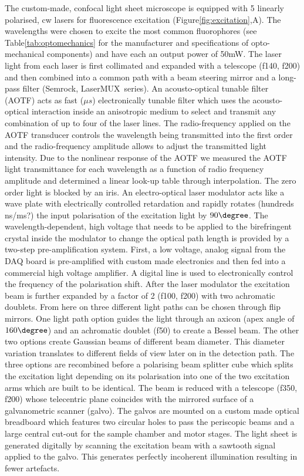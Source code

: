 \documentclass[12pt]{spieman}  %
\begin{document}
The custom-made, confocal light sheet microscope is equipped with 5 linearly polarised, cw lasers for fluorescence excitation (Figure\ref{fig:excitation},A). The wavelengths were chosen to excite the most common fluorophores (see Table\ref{tab:optomechanics} for the manufacturer and specifications of opto-mechanical components) and have each an output power of 50mW. The laser light from each laser is first collimated and expanded with a telescope (f140, f200) and then combined into a common path with a beam steering mirror and a long-pass filter (Semrock, LaserMUX\texttrademark\ series). An acousto-optical tunable filter (AOTF) acts as fast ($\mu s$) electronically tunable filter which uses the acousto-optical interaction inside an anisotropic medium to select and transmit any combination of up to four of the laser lines. The radio-frequency applied on the AOTF transducer controls the wavelength being transmitted into the first order and the radio-frequency amplitude allows to adjust the transmitted light intensity. Due to the nonlinear response of the AOTF we measured the AOTF light transmittance for each wavelength as a function of radio frequency amplitude and determined a linear look-up table through interpolation. The zero order light is blocked by an iris. An electro-optical laser modulator acts like a wave plate with electrically controlled retardation and rapidly rotates (hundreds ns/ms?) the input polarisation of the excitation light by $90\degree$. The wavelength-dependent, high voltage that needs to be applied to the birefringent crystal inside the modulator to change the optical path length is provided by a two-step pre-amplification system. First, a low voltage, analog signal from the DAQ board is pre-amplified with custom made electronics and then fed into a commercial high voltage amplifier. A digital line is used to electronically control the frequency of the polarisation shift. After the laser modulator the excitation beam is further expanded by a factor of 2 (f100, f200) with two achromatic doublets. From here on three different light paths can be chosen through flip mirrors. One light path option guides the light through an axicon (apex angle of $160\degree$) and an achromatic doublet (f50) to create a Bessel beam. The other two options create Gaussian beams of different beam diameter. This diameter variation translates to different fields of view later on in the detection path. The three options are recombined before a polarising beam splitter cube which splits the excitation light depending on its polarisation into one of the two excitation arms which are built to be identical. The beam is reduced with a telescope (f350, f200) whose telecentric plane coincides with the mirrored surface of a galvanometric scanner (galvo). The galvos are mounted on a custom made optical breadboard which features two circular holes to pass the periscopic beams and a large central cut-out for the sample chamber and motor stages. The light sheet is generated digitally by scanning the excitation beam with a sawtooth signal applied to the galvo. This generates perfectly incoherent illumination resulting in fewer artefacts.%
\end{document}
